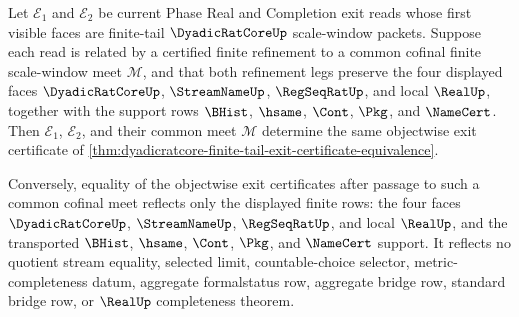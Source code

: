 \begin{theorem}
\label{thm:dyadicratcore-finite-tail-exit-certificate-cofinal-meet-stability}
Let $\mathcal E_1$ and $\mathcal E_2$ be current Phase Real and Completion exit reads whose first visible faces are finite-tail $\DyadicRatCoreUp$ scale-window packets. Suppose each read is related by a certified finite refinement to a common cofinal finite scale-window meet $\mathcal M$, and that both refinement legs preserve the four displayed faces $\DyadicRatCoreUp$, $\StreamNameUp$, $\RegSeqRatUp$, and local $\RealUp$, together with the support rows $\BHist$, $\hsame$, $\Cont$, $\Pkg$, and $\NameCert$. Then $\mathcal E_1$, $\mathcal E_2$, and their common meet $\mathcal M$ determine the same objectwise exit certificate of \autoref{thm:dyadicratcore-finite-tail-exit-certificate-equivalence}.

Conversely, equality of the objectwise exit certificates after passage to such a common cofinal meet reflects only the displayed finite rows: the four faces $\DyadicRatCoreUp$, $\StreamNameUp$, $\RegSeqRatUp$, and local $\RealUp$, and the transported $\BHist$, $\hsame$, $\Cont$, $\Pkg$, and $\NameCert$ support. It reflects no quotient stream equality, selected limit, countable-choice selector, metric-completeness datum, aggregate formalstatus row, aggregate bridge row, standard bridge row, or $\RealUp$ completeness theorem.
\end{theorem}
